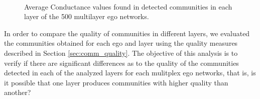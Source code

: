 \begin{figure}[h!tb]
    \centering
     \\
    \caption{Average Conductance values found in detected communities in each layer of the 500 multilayer ego networks.}
    \label{fig:comm_metrics_conductance}
\end{figure}

In order to compare the quality of communities in different layers, we evaluated the communities obtained for each ego and layer using the quality measures described in Section \ref{sec:comm_quality}. The objective of this analysis is to verify if there are significant differences as to the quality of the communities detected in each of the analyzed layers for each mulitplex ego networks, that is, is it possible that one layer produces communities with higher quality than another?



